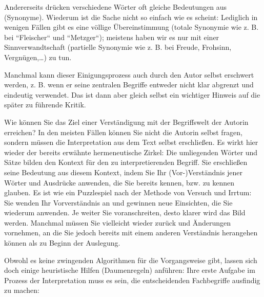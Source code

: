 \documentclass[]{book}
\theoremstyle{definition}
\theoremstyle{definition}
\theoremstyle{definition}
\theoremstyle{remark}
\begin{document}
Andererseits drücken verschiedene Wörter oft gleiche Bedeutungen aus
(Synonyme). Wiederum ist die Sache nicht so einfach wie es scheint:
Lediglich in wenigen Fällen gibt es eine völlige Übereinstimmung (totale
Synonymie wie z. B. bei ``Fleischer`` und ``Metzger``); meistens haben
wir es nur mit einer Sinnverwandtschaft (partielle Synonymie wie z. B.
bei Freude, Frohsinn, Vergnügen,\ldots{}) zu tun.

Manchmal kann dieser Einigungsprozess auch durch den Autor selbst
erschwert werden, z. B. wenn er seine zentralen Begriffe entweder nicht
klar abgrenzt und eindeutig verwendet. Das ist dann aber gleich selbst
ein wichtiger Hinweis auf die später zu führende Kritik.

Wie können Sie das Ziel einer Verständigung mit der Begriffswelt der
Autorin erreichen? In den meisten Fällen können Sie nicht die Autorin
selbst fragen, sondern müssen die Interpretation aus dem Text selbst
erschließen. Es wirkt hier wieder der bereits erwähnte hermeneutische
Zirkel: Die umliegenden Wörter und Sätze bilden den Kontext für den zu
interpretierenden Begriff. Sie erschließen seine Bedeutung aus diesem
Kontext, indem Sie Ihr (Vor-)Verständnis jener Wörter und Ausdrücke
anwenden, die Sie bereits kennen, bzw. zu kennen glauben. Es ist wie ein
Puzzlespiel nach der Methode von Versuch und Irrtum: Sie wenden Ihr
Vorverständnis an und gewinnen neue Einsichten, die Sie wiederum
anwenden. Je weiter Sie voranschreiten, desto klarer wird das Bild
werden. Manchmal müssen Sie vielleicht wieder zurück und Änderungen
vornehmen, an die Sie jedoch bereits mit einem anderen Verständnis
herangehen können als zu Beginn der Auslegung.

Obwohl es keine zwingenden Algorithmen für die Vorgangsweise gibt,
lassen sich doch einige heuristische Hilfen (Daumenregeln) anführen:
Ihre erste Aufgabe im Prozess der Interpretation muss es sein, die
entscheidenden Fachbegriffe ausfindig zu machen:
\end{document}
